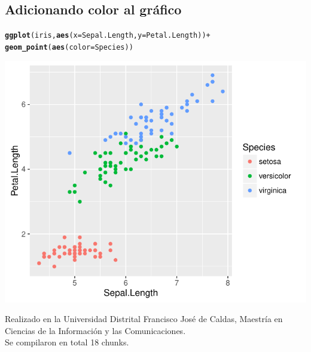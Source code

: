 \documentclass{article}\usepackage[]{graphicx}\usepackage[]{color}
\makeatletter
\def\maxwidth{ %
  \ifdim\Gin@nat@width>\linewidth
    \linewidth
  \else
    \Gin@nat@width
  \fi
}
\newcommand{\hlopt}[1]{\textcolor[rgb]{0,0,0}{#1}}%
\newcommand{\hlstd}[1]{\textcolor[rgb]{0.345,0.345,0.345}{#1}}%
\newcommand{\hlkwc}[1]{\textcolor[rgb]{0.333,0.667,0.333}{#1}}%
\newcommand{\hlkwd}[1]{\textcolor[rgb]{0.737,0.353,0.396}{\textbf{#1}}}%
\newenvironment{kframe}{%
 \def\at@end@of@kframe{}%
 \ifinner\ifhmode%
  \def\at@end@of@kframe{\end{minipage}}%
  \begin{minipage}{\columnwidth}%
 \fi\fi%
 \def\FrameCommand##1{\hskip\@totalleftmargin \hskip-\fboxsep
 \colorbox{shadecolor}{##1}\hskip-\fboxsep
     \hskip-\linewidth \hskip-\@totalleftmargin \hskip\columnwidth}%
 \MakeFramed {\advance\hsize-\width
   \@totalleftmargin\z@ \linewidth\hsize
   \@setminipage}}%
 {\par\unskip\endMakeFramed%
 \at@end@of@kframe}
\newenvironment{knitrout}{}{} %
\makeatother
\begin{document}
\subsection*{Adicionando color al gráfico}
\begin{knitrout}
\color{fgcolor}\begin{kframe}
\begin{alltt}
\hlkwd{ggplot}\hlstd{(iris,} \hlkwd{aes}\hlstd{(}\hlkwc{x} \hlstd{= Sepal.Length,} \hlkwc{y} \hlstd{= Petal.Length))} \hlopt{+}
  \hlkwd{geom_point}\hlstd{(}\hlkwd{aes}\hlstd{(}\hlkwc{color} \hlstd{= Species))}
\end{alltt}
\end{kframe}

{\centering \includegraphics[width=\maxwidth]{figure/minimal-r18-1} 

}



\end{knitrout}


Realizado en la Universidad Distrital Francisco José de Caldas, Maestría en Ciencias de la Información y las Comunicaciones.\\

Se compilaron en total 18 chunks.
\end{document}
